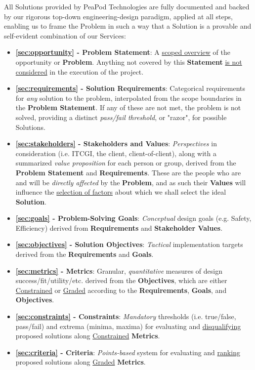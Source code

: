 
All Solutions provided by PeaPod Technologies are fully documented and backed by our rigorous top-down engineering-design paradigm, applied at all steps, enabling us to frame the Problem in such a way that a Solution is a provable and self-evident combination of our Services:

\begin{itemize}
    \item \textbf{\ref{sec:opportunity} - Problem Statement}: A \uline{scoped overview} of the opportunity or \textbf{Problem}. Anything not covered by this \textbf{Statement} \uline{is not considered} in the execution of the project.
    \item \textbf{\ref{sec:requirements} - Solution Requirements}: Categorical requirements for \textit{any} solution to the problem, interpolated from the scope boundaries in the \textbf{Problem Statement}. If any of these are not met, the problem is not solved, providing a distinct \textit{pass/fail threshold}, or "razor", for possible Solutions.
    \item \textbf{\ref{sec:stakeholders} - Stakeholders and Values}: \textit{Perspectives} in consideration (i.e. ITCGI, the client, client-of-client), along with a summarized \textit{value proposition} for each person or group, derived from the \textbf{Problem Statement} and \textbf{Requirements}. These are the people who are and will be \textit{directly affected} by the \textbf{Problem}, and as such their \textbf{Values} will influence the \uline{selection of factors} about which we shall select the ideal \textbf{Solution}.
    \item \textbf{\ref{sec:goals} - Problem-Solving Goals}: \textit{Conceptual} design goals (e.g. Safety, Efficiency) derived from \textbf{Requirements} and \textbf{Stakeholder Values}.
    \item \textbf{\ref{sec:objectives} - Solution Objectives}: \textit{Tactical} implementation targets derived from the \textbf{Requirements} and \textbf{Goals}.
    \item \textbf{\ref{sec:metrics} - Metrics}: Granular, \textit{quantitative} measures of design success/fit/utility/etc. derived from the \textbf{Objectives}, which are either \uline{Constrained} or \uline{Graded} according to the \textbf{Requirements}, \textbf{Goals}, and \textbf{Objectives}.
    \item \textbf{\ref{sec:constraints} - Constraints}: \textit{Mandatory} thresholds (i.e. true/false, pass/fail) and extrema (minima, maxima) for evaluating and \uline{disqualifying} proposed solutions along \uline{Constrained} \textbf{Metrics}.
    \item \textbf{\ref{sec:criteria} - Criteria}: \textit{Points-based} system for evaluating and \uline{ranking} proposed solutions along \uline{Graded} \textbf{Metrics}.
\end{itemize} 